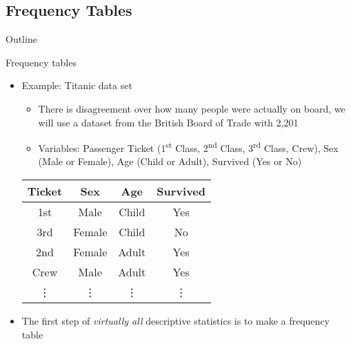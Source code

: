 \documentclass[xcolor=dvipsnames]{beamer}
\begin{document}
\subsection{Frequency Tables}
\begin{frame}{Outline}
\tableofcontents[currentsection,subsectionstyle=show/shaded/hide]
\end{frame}

\begin{frame}{Frequency tables}
	\begin{itemize}
		\item Example: Titanic data set
		\begin{itemize}
			\item There is disagreement over how many people were actually on board, we will use a dataset from the British Board of Trade with 2,201
			\item Variables: Passenger Ticket (1\textsuperscript{st} Class, 2\textsuperscript{nd} Class, 3\textsuperscript{rd} Class, Crew), Sex (Male or Female), Age (Child or Adult), Survived (Yes or No)
		\end{itemize}
	\begin{center}
				\begin{tabular}{|c|c|c|c|}
			\hline 
			\textbf{Ticket} & \textbf{Sex} & \textbf{Age} & \textbf{Survived}  \\ 
			\hline \hline
			1st & Male & Child & Yes \\ 
			\hline 
			3rd & Female & Child & No \\ 
			\hline 
			2nd & Female & Adult & Yes \\ 
			\hline 
			Crew & Male & Adult & Yes \\ 
			\hline
			\vdots & \vdots & \vdots & \vdots \\
			\hline 
		\end{tabular} 
	\end{center}
		\item The first step of \emph{virtually all} descriptive statistics is to make a frequency table
	\end{itemize}
\end{frame}
\end{document}
